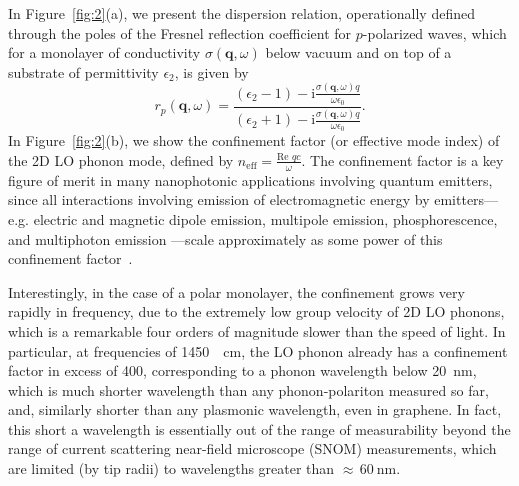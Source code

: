 \documentclass[aps,prb,twocolumn,
	           groupedaddress,superscriptaddress,
               amsfonts,amssymb,amsmath,floatfix,
	           citeautoscript]{revtex4-1}
\makeatletter
\newcommand{\iu}{\mathrm{i}}
\newcommand{\eg}{e.g.\@\xspace}
\makeatother
\begin{document}
In Figure~\ref{fig:2}(a), we present the dispersion relation, operationally defined through the poles of the Fresnel reflection coefficient for $p$-polarized waves, which for a monolayer of conductivity $\sigma(\mathbf{q},\omega)$
below vacuum and on top of a substrate of permittivity $\epsilon_{2}$, is given by
\begin{equation}
    r_p(\mathbf{q},\omega) = \frac{(\epsilon_{2}-1)-\iu\frac{\sigma(\mathbf{q},\omega) q}{\omega\epsilon_0}}{(\epsilon_{2}+1)-\iu\frac{\sigma(\mathbf{q},\omega) q}{\omega \epsilon_0}}.
\end{equation}
In Figure~\ref{fig:2}(b), we show the confinement factor (or effective mode index) of the 2D LO phonon mode, defined by $n_{\mathrm{eff}} = \frac{\text{Re } qc}{\omega}$. 
The confinement factor is a key figure of merit in many nanophotonic applications involving quantum emitters, since all interactions involving emission of electromagnetic energy by emitters---\eg electric and magnetic dipole emission, multipole emission, phosphorescence, and multiphoton emission ---scale approximately as some power of this confinement factor~\cite{archambault2010quantum,koppens2011graphene,rivera2016shrinking,rivera2017making,sloan2018extreme}.

Interestingly, in the case of a polar monolayer, the confinement grows very rapidly in frequency, due to the extremely low group velocity of 2D LO phonons, which is a remarkable four orders of magnitude slower than the speed of light.  In particular, at frequencies of \SI{1450}{\per\cm}, the LO phonon already has a confinement factor in excess of \num{400}, corresponding to a phonon wavelength below \SI{20}{\nm}, which is much shorter wavelength than any phonon-polariton measured so far, and, similarly shorter than any plasmonic wavelength, even in graphene. In fact, this short a wavelength is essentially out of the range of measurability beyond the range of current scattering near-field microscope (SNOM) measurements, which are limited (by tip radii) to wavelengths greater than $\approx\,\SI{60}{\nm}$.
\end{document}
